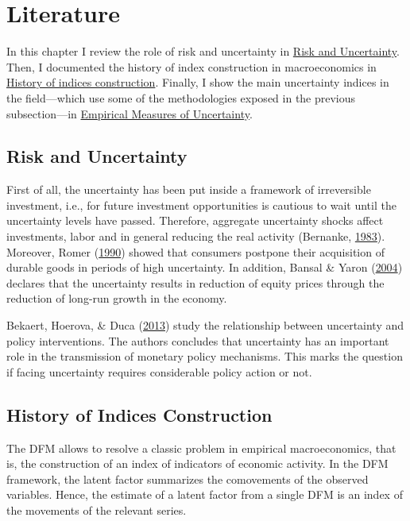 \documentclass[12pt,twoside]{reedthesis}
\begin{document}
\hypertarget{literature}{%
\chapter{Literature}\label{literature}}

In this chapter I review the role of risk and uncertainty in \protect\hyperlink{risk-and-uncertainty}{Risk and Uncertainty}. Then, I documented the history of index construction in macroeconomics in \protect\hyperlink{history-of-indices-construction}{History of indices construction}. Finally, I show the main uncertainty indices in the field---which use some of the methodologies exposed in the previous subsection---in \protect\hyperlink{empirical-measures-of-uncertainty}{Empirical Measures of Uncertainty}.

\hypertarget{risk-and-uncertainty}{%
\section{Risk and Uncertainty}\label{risk-and-uncertainty}}

First of all, the uncertainty has been put inside a framework of irreversible investment, i.e., for future investment opportunities is cautious to wait until the uncertainty levels have passed. Therefore, aggregate uncertainty shocks affect investments, labor and in general reducing the real activity (Bernanke, \protect\hyperlink{ref-bernanke:1983}{1983}). Moreover, Romer (\protect\hyperlink{ref-romer:1990}{1990}) showed that consumers postpone their acquisition of durable goods in periods of high uncertainty. In addition, Bansal \& Yaron (\protect\hyperlink{ref-bansyaro:2004}{2004}) declares that the uncertainty results in reduction of equity prices through the reduction of long-run growth in the economy.

Bekaert, Hoerova, \& Duca (\protect\hyperlink{ref-bekahoerduca:2013}{2013}) study the relationship between uncertainty and policy interventions. The authors concludes that uncertainty has an important role in the transmission of monetary policy mechanisms. This marks the question if facing uncertainty requires considerable policy action or not.

\hypertarget{history-of-indices-construction}{%
\section{History of Indices Construction}\label{history-of-indices-construction}}

The DFM allows to resolve a classic problem in empirical macroeconomics, that is, the construction of an index of indicators of economic activity. In the DFM framework, the latent factor summarizes the comovements of the observed variables. Hence, the estimate of a latent factor from a single DFM is an index of the movements of the relevant series.
\end{document}
